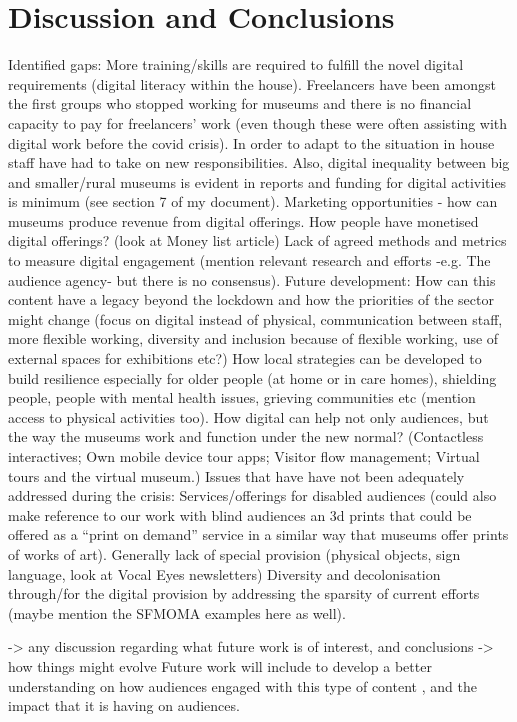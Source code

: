 \documentclass{egpubl}
\begin{document}
\section{Discussion and Conclusions}
Identified gaps:
More training/skills are required to fulfill the novel digital requirements (digital literacy within the house). Freelancers have been amongst the first groups who stopped working for museums and there is no financial capacity to pay for freelancers' work (even though these were often assisting with digital work before the covid crisis). In order to adapt to the situation in house staff have had to take on new responsibilities. Also, digital inequality between big and smaller/rural museums is evident in reports and funding for digital activities is minimum (see section 7 of my document).
Marketing opportunities  - how can museums produce revenue from digital offerings. How people have monetised digital offerings? (look at Money list article)
Lack of agreed methods and metrics to measure digital engagement (mention relevant research and efforts -e.g. The audience agency- but there is no consensus).
Future development:
How can this content have a legacy beyond the lockdown and how the priorities of the sector might change (focus on digital instead of physical, communication between staff, more flexible working, diversity and inclusion because of flexible working, use of external spaces for exhibitions etc?)
How local strategies can be developed to build resilience especially for older people (at home or in care homes), shielding people, people with mental health issues, grieving communities etc (mention access to physical activities too). 
How digital can help not only audiences, but the way the museums work and function under the new normal? (Contactless interactives; Own mobile device tour apps; Visitor flow management; Virtual tours and the virtual museum.)
Issues that have have not been adequately addressed during the crisis:
Services/offerings for disabled audiences (could also make reference to our work with blind audiences an 3d prints that could be offered as a “print on demand” service in a similar way that museums offer prints of works of art). Generally lack of special provision (physical objects, sign language, look at Vocal Eyes newsletters)
Diversity and decolonisation through/for the digital provision by addressing the sparsity of current efforts (maybe mention the SFMOMA examples here as well).

-> any discussion regarding what future work is of interest, and conclusions
->  how things might evolve
Future work will include to develop a better  understanding on how audiences engaged with this type of content  , and the impact that it is having on audiences. 
\end{document}
